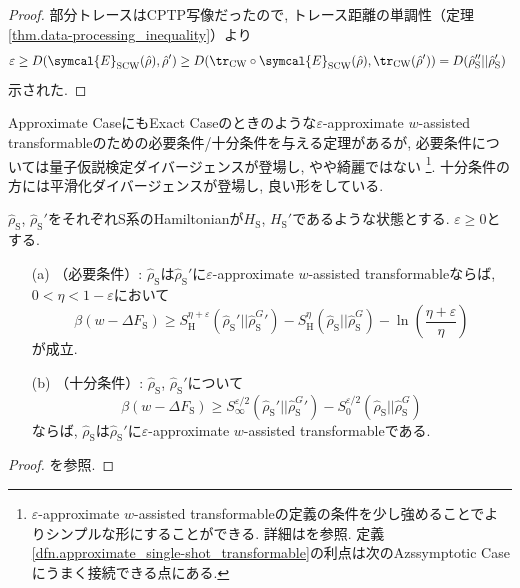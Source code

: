\begin{proof}
  部分トレースはCPTP写像だったので, トレース距離の単調性（定理\ref{thm.data-processing_inequality}）より
  \begin{equation}
    \varepsilon\geq D(\symcal{E}_{\text{SCW}}(\hat{\rho}), \hat{\rho}')\geq D(\tr_{\text{CW}}\circ\symcal{E}_{\text{SCW}}(\hat{\rho}), \tr_{\text{CW}}(\hat{\rho}'))=D(\hat{\rho}_{\text{S}}''||\hat{\rho}_{\text{S}}')\
  \end{equation}
  示された. 
\end{proof}

Approximate CaseにもExact Caseのときのような$\varepsilon$-approximate $w$-assisted transformableのための必要条件/十分条件を与える定理があるが, 必要条件については量子仮説検定ダイバージェンスが登場し, やや綺麗ではない
\footnote{$\varepsilon$-approximate $w$-assisted transformableの定義の条件を少し強めることでよりシンプルな形にすることができる. 
詳細は\cite{SagawaEntropy}を参照. 
定義\ref{dfn.approximate_single-shot_transformable}の利点は次のAzssymptotic Caseにうまく接続できる点にある. }. 
十分条件の方には平滑化ダイバージェンスが登場し, 良い形をしている. 

\begin{mythm}\label{thm.approximate-case_single-shot_work_bounds}
  $\hat{\rho}_{\text{S}}$, $\hat{\rho}_{\text{S}}'$をそれぞれS系のHamiltonianが$H_{\text{S}}$, $H_{\text{S}}'$であるような状態とする. 
  $\varepsilon\geq 0$とする. 
  \begin{enumerate}
    \item[(a)]（必要条件）: $\hat{\rho}_\text{S}$は$\hat{\rho}_\text{S}'$に$\varepsilon$-approximate $w$-assisted transformableならば, $0<\eta<1-\varepsilon$において
    \begin{equation}
      \beta(w-\Delta F_{\text{S}})\geq S_{\text{H}}^{\eta+\varepsilon} (\hat{\rho}_{\text{S}}{}'||\hat{\rho}_{\text{S}}^{G}{}')-S_{\text{H}}^\eta (\hat{\rho}_{\text{S}}||\hat{\rho}_{\text{S}}^G)-\ln\left( \frac{\eta+\varepsilon}{\eta} \right)
    \end{equation}
    が成立. 
    \item[(b)]（十分条件）: $\hat{\rho}_{\text{S}}$, $\hat{\rho}_{\text{S}}'$について
    \begin{equation}
      \beta(w-\Delta F_{\text{S}})\geq S_{\infty}^{\varepsilon/2} (\hat{\rho}_{\text{S}}{}'||\hat{\rho}_{\text{S}}^{G}{}')-S_{0}^{\varepsilon/2}  (\hat{\rho}_{\text{S}}||\hat{\rho}_{\text{S}}^G)
    \end{equation}
    ならば, $\hat{\rho}_\text{S}$は$\hat{\rho}_\text{S}'$に$\varepsilon$-approximate $w$-assisted transformableである. 
  \end{enumerate}
\end{mythm}

\begin{proof}
  \cite{SagawaEntropy}を参照. 
\end{proof}





